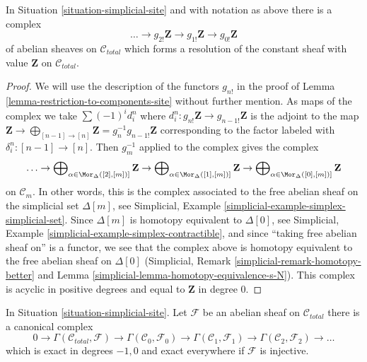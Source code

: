 \begin{lemma}
\label{lemma-simplicial-resolution-Z-site}
In Situation \ref{situation-simplicial-site} and with notation as above
there is a complex
$$
\ldots \to g_{2!}\mathbf{Z} \to g_{1!}\mathbf{Z} \to g_{0!}\mathbf{Z}
$$
of abelian sheaves on $\mathcal{C}_{total}$ which forms a resolution of
the constant sheaf with value $\mathbf{Z}$ on $\mathcal{C}_{total}$.
\end{lemma}

\begin{proof}
We will use the description of the functors $g_{n!}$ in the proof of
Lemma \ref{lemma-restriction-to-components-site} without further mention.
As maps of the complex we take $\sum (-1)^i d^n_i$ where
$d^n_i : g_{n!}\mathbf{Z} \to g_{n - 1!}\mathbf{Z}$ is the
adjoint to the map $\mathbf{Z} \to
\bigoplus_{[n - 1] \to [n]} \mathbf{Z} = g_n^{-1}g_{n - 1!}\mathbf{Z}$
corresponding to the factor labeled with $\delta^n_i : [n - 1] \to [n]$.
Then $g_m^{-1}$ applied to the complex gives the complex
$$
\ldots \to
\bigoplus\nolimits_{\alpha \in \Mor_\Delta([2], [m])]} \mathbf{Z} \to
\bigoplus\nolimits_{\alpha \in \Mor_\Delta([1], [m])]} \mathbf{Z} \to
\bigoplus\nolimits_{\alpha \in \Mor_\Delta([0], [m])]} \mathbf{Z}
$$
on $\mathcal{C}_m$.
In other words, this is the complex associated to the
free abelian sheaf on the simplicial set $\Delta[m]$, see
Simplicial, Example \ref{simplicial-example-simplex-simplicial-set}.
Since $\Delta[m]$ is homotopy equivalent to $\Delta[0]$, see
Simplicial, Example \ref{simplicial-example-simplex-contractible},
and since ``taking free abelian sheaf on'' is a functor,
we see that the complex above is homotopy equivalent to
the free abelian sheaf on $\Delta[0]$
(Simplicial, Remark \ref{simplicial-remark-homotopy-better} and
Lemma \ref{simplicial-lemma-homotopy-equivalence-s-N}).
This complex is acyclic in positive degrees
and equal to $\mathbf{Z}$ in degree $0$.
\end{proof}

\begin{lemma}
\label{lemma-cech-complex}
In Situation \ref{situation-simplicial-site}. Let $\mathcal{F}$ be an abelian
sheaf on $\mathcal{C}_{total}$ there is a canonical complex
$$
0 \to \Gamma(\mathcal{C}_{total}, \mathcal{F}) \to
\Gamma(\mathcal{C}_0, \mathcal{F}_0) \to
\Gamma(\mathcal{C}_1, \mathcal{F}_1) \to
\Gamma(\mathcal{C}_2, \mathcal{F}_2) \to \ldots
$$
which is exact in degrees $-1, 0$ and exact everywhere
if $\mathcal{F}$ is injective.
\end{lemma}

